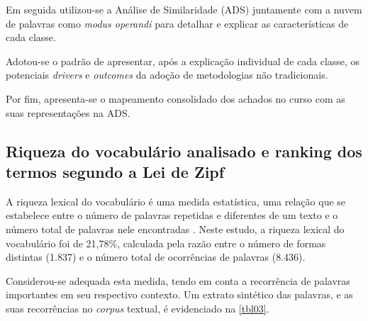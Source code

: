 \documentclass{textolivre-html}
\begin{document}
Em seguida utilizou-se a Análise de Similaridade (ADS) juntamente com a nuvem de palavras como \textit{modus operandi} para detalhar e explicar as características de cada classe. 

Adotou-se o padrão de apresentar, após a explicação individual de cada classe, os potenciais \textit{drivers} e \textit{outcomes} da adoção de metodologias não tradicionais.

Por fim, apresenta-se o mapeamento consolidado dos achados no curso com as suas representações na ADS. 

\subsection{Riqueza do vocabulário analisado e ranking dos termos segundo a Lei de Zipf}\label{sec-riqueza}
A riqueza lexical do vocabulário é uma medida estatística, uma relação que se estabelece entre o número de palavras repetidas e diferentes de um texto e o número total de palavras nele encontradas \cite{sardinha2008}. Neste estudo, a riqueza lexical do vocabulário foi de 21,78\%, calculada pela razão entre o número de formas distintas (1.837) e o número total de ocorrências de palavras (8.436).

Considerou-se adequada esta medida, tendo em conta a recorrência de palavras importantes em seu respectivo contexto. Um extrato sintético das palavras, e as suas recorrências no \textit{corpus} textual, é evidenciado na \cref{tbl03}.


\begin{table}
\caption{Aplicação da Lei de Zipf nos documentos de Engenharia Elétrica e de Computadores.}
\label{tbl03}
\noindent{}
\end{table}
\end{document}
